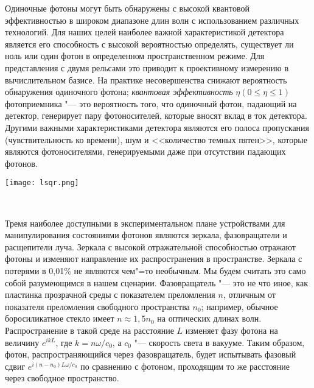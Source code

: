 \begin{multicols}{2}
{        Одиночные фотоны могут быть обнаружены с высокой квантовой эффективностью в широком диапазоне
        длин волн с использованием различных технологий. Для наших целей наиболее важной характеристикой детектора является его способность с высокой вероятностью определять, существует ли
        ноль или один фотон в определенном пространственном режиме. Для представления с двумя рельсами
        это приводит к проективному измерению в вычислительном базисе. На практике несовершенства снижают вероятность обнаружения одиночного фотона; \emph{квантовая эффективность} 
        $\eta (0 \leq \eta \leq 1)$ 
        фотоприемника "--- это вероятность того, что одиночный фотон, падающий
        на детектор, генерирует пару фотоносителей, которые вносят вклад в ток детектора. Другими
        важными характеристиками детектора являются его полоса пропускания (чувствительность ко времени), шум и
        <<количество темных пятен>>, которые являются фотоносителями, генерируемыми даже при отсутствии падающих фотонов.
    }\\
    \begin{flushleft}
        \begin{minipage}{0.3\textwidth}{\texttt{[image: lsqr.png]}}
        \end{minipage}\\
        \vspace{0.3cm}
    \end{flushleft}
    \normalsize{
        Тремя наиболее доступными в экспериментальном плане устройствами для манипулирования состояниями фотонов являются
        зеркала, фазовращатели и расщепители луча. Зеркала с высокой отражательной способностью отражают фотоны и
        изменяют направление их распространения в пространстве. Зеркала с потерями в 0,01\% не являются чем"=то необычным.
        Мы будем считать это само собой разумеющимся в нашем сценарии. Фазовращатель "--- это не что
        иное, как пластинка прозрачной среды с показателем преломления $n$, отличным от показателя преломления свободного
        пространства $n_0$; например, обычное боросиликатное стекло имеет $n\approx 1,5n_0$ на оптических длинах волн.
        Распространение в такой среде на расстояние $L$ изменяет фазу фотона на величину $e^{ikL}$,
        где $k = n\omega/c_0$, а $c_0$ "--- скорость света в вакууме. Таким образом, фотон, распространяющийся
        через фазовращатель, будет испытывать фазовый сдвиг $e^{i(n-n_0)L\omega/c_0}$ по сравнению с фотоном, 
        проходящим то же расстояние через свободное пространство.

}
\end{multicols}
